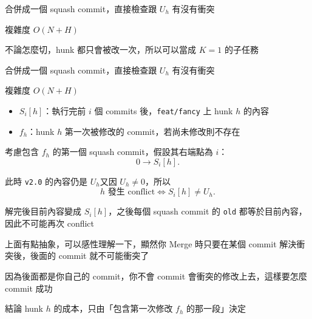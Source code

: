 \begin{frame}{}
    合併成一個 squash commit，直接檢查跟 $U_h$ 有沒有衝突

    複雜度 $O(N+H)$
\end{frame}

%

\begin{frame}{}
    不論怎麼切，hunk 都只會被改一次，所以可以當成 $K=1$ 的子任務

    合併成一個 squash commit，直接檢查跟 $U_h$ 有沒有衝突

    複雜度 $O(N+H)$
\end{frame}

\begin{frame}{}
    \begin{itemize}
        \item $S_i[h]$：執行完前 $i$ 個 commits 後，\texttt{feat/fancy} 上 hunk $h$ 的內容
        \item $f_h$：hunk $h$ 第一次被修改的 commit，若尚未修改則不存在
    \end{itemize}
\end{frame}

\begin{frame}{}
    考慮包含 $f_h$ 的第一個 squash commit，假設其右端點為 $i$：
    \[
        0\longrightarrow S_i[h].
    \]

    此時 \texttt{v2.0} 的內容仍是 $U_h$又因 $U_h\neq 0$，所以
    \[
        h\text{ 發生 conflict}
        \iff S_i[h]\neq U_h.
    \]
\end{frame}

\begin{frame}{}
    解完後目前內容變成 $S_i[h]$，之後每個 squash commit 的
    \texttt{old} 都等於目前內容，因此不可能再次 conflict

    上面有點抽象，可以感性理解一下，顯然你 Merge 時只要在某個 commit 解決衝突後，後面的 commit 就不可能衝突了

    因為後面都是你自己的 commit，你不會 commit 會衝突的修改上去，這樣要怎麼 commit 成功

    \begin{alertblock}{結論}
        hunk $h$ 的成本，只由「包含第一次修改 $f_h$ 的那一段」決定
    \end{alertblock}
\end{frame}

